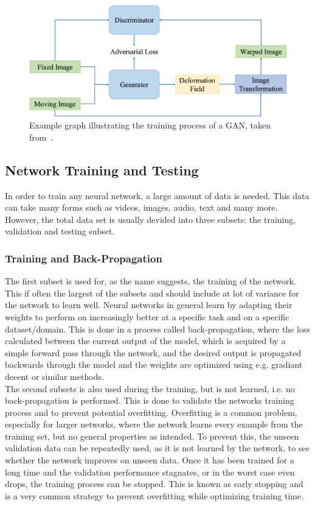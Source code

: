 \documentclass[english,version-2022-01]{uzl-thesis} %
\begin{document}
\begin{figure}[h] %
	\centering
	\graphicspath{{images/}{\main/images/}}
	\includegraphics[width=\linewidth]{GANRegistrationGraph.jpg} 
	\caption{Example graph illustrating the training process of a GAN, taken from~\cite{Zou2022}.}
	\label{fig:GANRegistration}
\end{figure}

\subsection{Network Training and Testing} \label{SubSec:NetworkTrainingAndTesting}
In order to train any neural network, a large amount of data is needed. This data can take many forms such as videos, images, audio, text and many more. However, the total data set is usually devided into three subsets: the training, validation and testing subset. 

\subsubsection{Training and Back-Propagation}
The first subset is used for, as the name suggests, the training of the network. This if often the largest of the subsets and should include at lot of variance for the network to learn well. Neural networks in general learn by adapting their weights to perform on increasingly better at a specific task and on a specific dataset/domain. This is done in a process called back-propagation, where the loss calculated between the current output of the model, which is acquired by a simple forward pass through the network, and the desired output is propagated backwards through the model and the weights are optimized using e.g. gradiant decent or similar methods. \\
The second subsets is also used during the training, but is not learned, i.e. no back-propagation is performed. This is done to validate the networks training process and to prevent potential overfitting. Overfitting is a common problem, especially for larger networks, where the network learns every example from the training set, but no general properties as intended. To prevent this, the unseen validation data can be repeatedly used, as it is not learned by the network, to see whether the network improves on unseen data. Once it has been trained for a long time and the validation performance stagnates, or in the worst case even drops, the training process can be stopped. This is known as early stopping and is a very common strategy to prevent overfitting while optimizing training time.\\
\end{document}
